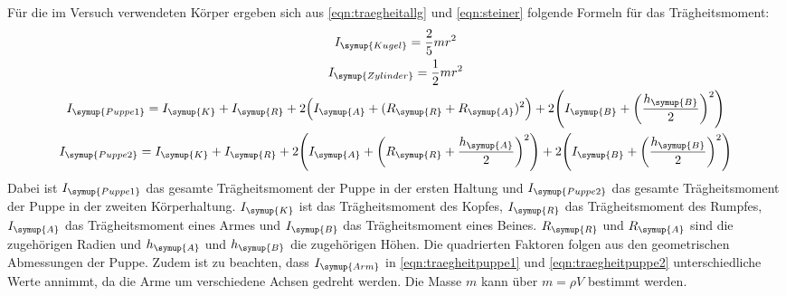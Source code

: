 Für die im Versuch verwendeten Körper ergeben sich aus \eqref{eqn:traegheitallg}
und \eqref{eqn:steiner} folgende Formeln für das Trägheitsmoment:
\begin{gather}
  I_{\symup{Kugel}}=\frac{2}{5}mr^2
  \label{eqn:traegheitkugel} \\
  I_{\symup{Zylinder}}=\frac{1}{2}mr^2
  \label{eqn:traegheitzylinder} \\
  \begin{split}
    I_{\symup{Puppe1}}=I_{\symup{K}}+I_{\symup{R}}
    +2\Bigl(I_{\symup{A}}+(R_{\symup{R}}+R_{\symup{A}})^2\Bigr)
    +2\Biggl(I_{\symup{B}}+\biggl(\frac{h_{\symup{B}}}{2}\biggr)^2\Biggr)
    \label{eqn:traegheitpuppe1}
  \end{split}
  \\
  \begin{split}
    I_{\symup{Puppe2}}=I_{\symup{K}}+I_{\symup{R}}
    +2\Biggl(I_{\symup{A}}+\biggl(R_{\symup{R}}+\frac{h_{\symup{A}}}{2}\biggr)^2\Biggr)
    +2\Biggl(I_{\symup{B}}+\biggl(\frac{h_{\symup{B}}}{2}\biggr)^2\Biggr)
    \label{eqn:traegheitpuppe2}
  \end{split}
\end{gather}
Dabei ist $I_{\symup{Puppe1}}$ das gesamte Trägheitsmoment der Puppe in der ersten
Haltung und $I_{\symup{Puppe2}}$ das gesamte Trägheitsmoment der Puppe in der
zweiten Körperhaltung. $I_{\symup{K}}$ ist das Trägheitsmoment des Kopfes, $I_{\symup{R}}$
das Trägheitsmoment des Rumpfes, $I_{\symup{A}}$ das Trägheitsmoment eines Armes und
$I_{\symup{B}}$ das Trägheitsmoment eines Beines. $R_{\symup{R}}$ und $R_{\symup{A}}$ sind die zugehörigen
Radien und $h_{\symup{A}}$ und $h_{\symup{B}}$ die zugehörigen Höhen. Die quadrierten Faktoren folgen
aus den geometrischen Abmessungen der Puppe. Zudem ist zu beachten, dass $I_{\symup{Arm}}$
in \eqref{eqn:traegheitpuppe1} und \eqref{eqn:traegheitpuppe2} unterschiedliche Werte
annimmt, da die Arme um verschiedene Achsen gedreht werden. Die Masse $m$ kann
über $m=\rho V$ bestimmt werden.
